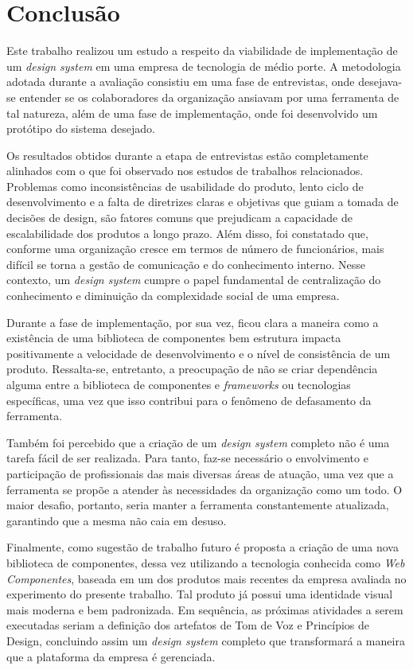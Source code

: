 
\chapter{Conclusão}
\label{chap:conclusao}

Este trabalho realizou um estudo a respeito da viabilidade de implementação de um \textit{design system} em uma empresa de tecnologia de médio porte. A metodologia adotada durante a avaliação consistiu em uma fase de entrevistas, onde desejava-se entender se os colaboradores da organização ansiavam por uma ferramenta de tal natureza, além de uma fase de implementação, onde foi desenvolvido um protótipo do sistema desejado.

Os resultados obtidos durante a etapa de entrevistas estão completamente alinhados com o que foi observado nos estudos de trabalhos relacionados. Problemas como inconsistências de usabilidade do produto, lento ciclo de desenvolvimento e a falta de diretrizes claras e objetivas que guiam a tomada de decisões de design, são fatores comuns que prejudicam a capacidade de escalabilidade dos produtos a longo prazo. Além disso, foi constatado que, conforme uma organização cresce em termos de número de funcionários, mais difícil se torna a gestão de comunicação e do conhecimento interno. Nesse contexto, um \textit{design system} cumpre o papel fundamental de centralização do conhecimento e diminuição da complexidade social de uma empresa.

Durante a fase de implementação, por sua vez, ficou clara a maneira como a existência de uma biblioteca de componentes bem estrutura impacta positivamente a velocidade de desenvolvimento e o nível de consistência de um produto. Ressalta-se, entretanto, a preocupação de não se criar dependência alguma entre a biblioteca de componentes e \textit{frameworks} ou tecnologias específicas, uma vez que isso contribui para o fenômeno de defasamento da ferramenta.

Também foi percebido que a criação de um \textit{design system} completo não é uma tarefa fácil de ser realizada. Para tanto, faz-se necessário o envolvimento e participação de profissionais das mais diversas áreas de atuação, uma vez que a ferramenta se propõe a atender às necessidades da organização como um todo. O maior desafio, portanto, seria manter a ferramenta constantemente atualizada, garantindo que a mesma não caia em desuso.

Finalmente, como sugestão de trabalho futuro é proposta a criação de uma nova biblioteca de componentes, dessa vez utilizando a tecnologia conhecida como \textit{Web Componentes}, baseada em um dos produtos mais recentes da empresa avaliada no experimento do presente trabalho. Tal produto já possui uma identidade visual mais moderna e bem padronizada. Em sequência, as próximas atividades a serem executadas seriam a definição dos artefatos de Tom de Voz e Princípios de Design, concluindo assim um \textit{design system} completo que transformará a maneira que a plataforma da empresa é gerenciada.
